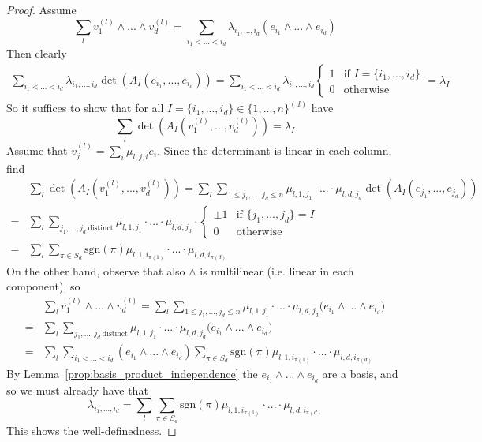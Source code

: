 \documentclass{scrartcl}
\newcommand{\sgn}{\mathrm{sgn}}
\theoremstyle{definition}
\begin{document}
\begin{proof}
    Assume
    \begin{equation*}
        \sum_l v_1^{(l)} \wedge ... \wedge v_d^{(l)} = \sum_{i_1 < ... < i_d} \lambda_{i_1, ..., i_d} (e_{i_1} \wedge ... \wedge e_{i_d})
    \end{equation*}
    Then clearly
    \begin{align*}
        \sum_{i_1 < ... < i_d} \lambda_{i_1, ..., i_d} \det(A_I(e_{i_1}, ..., e_{i_d})) = \sum_{i_1 < ... < i_d} \lambda_{i_1, ..., i_d} \begin{cases}
            1 & \text{if $I = \{i_1, ..., i_d\}$} \\
            0 & \text{otherwise}
        \end{cases} = \lambda_I
    \end{align*}
    So it suffices to show that for all $I = \{i_1, ..., i_d\} \in \{1, ..., n\}^{(d)}$ have
    \begin{equation*}
        \sum_l \det(A_I(v_1^{(l)}, ..., v_d^{(l)})) = \lambda_I
    \end{equation*}
    Assume that $v_j^{(l)} = \sum_i \mu_{l, j, i} e_i$. Since the determinant is linear in each column, find
    \begin{align*}
        &\sum_l \det(A_I(v_1^{(l)}, ..., v_d^{(l)})) = \sum_l \sum_{1 \leq j_1, ..., j_d \leq n} \mu_{l, 1, j_1} \cdot ... \cdot \mu_{l, d, j_d} \det(A_I(e_{j_1}, ..., e_{j_d})) \\
        =& \sum_l \sum_{j_1, ..., j_d \ \text{distinct}} \mu_{l, 1, j_1} \cdot ... \cdot \mu_{l, d, j_d} \cdot \begin{cases}
            \pm 1 & \text{if $\{j_1, ..., j_d\} = I$} \\
            0 & \text{otherwise}
        \end{cases} \\
        =& \sum_l \sum_{\pi \in S_d} \sgn(\pi) \mu_{l, 1, i_{\pi(1)}} \cdot ... \cdot \mu_{l, d, i_{\pi(d)}}
    \end{align*}
    On the other hand, observe that also $\wedge$ is multilinear (i.e. linear in each component), so
    \begin{align*}
        &\sum_l v_1^{(l)} \wedge ... \wedge v_d^{(l)} = \sum_l \sum_{1 \leq j_1, ..., j_d \leq n} \mu_{l, 1, j_1} \cdot ... \cdot \mu_{l, d, j_d} \bigl( e_{i_1} \wedge ... \wedge e_{i_d} \bigr) \\
        =& \sum_l \sum_{j_1, ..., j_d \ \text{distinct}} \mu_{l, 1, j_1} \cdot ... \cdot \mu_{l, d, j_d} \bigl( e_{i_1} \wedge ... \wedge e_{i_d} \bigr) \\
        =& \sum_l \sum_{i_1 < ... < i_d} (e_{i_1} \wedge ... \wedge e_{i_d}) \sum_{\pi \in S_d} \sgn(\pi) \mu_{l, 1, i_{\pi(1)}} \cdot ... \cdot \mu_{l, d, i_{\pi(d)}}
    \end{align*}
    By Lemma~\ref{prop:basis_product_independence} the $e_{i_1} \wedge ... \wedge e_{i_d}$ are a basis, and so we must already have that
    \begin{equation*}
        \lambda_{i_1, ..., i_d} = \sum_l \sum_{\pi \in S_d} \sgn(\pi) \mu_{l, 1, i_{\pi(1)}} \cdot ... \cdot \mu_{l, d, i_{\pi(d)}}
    \end{equation*}
    This shows the well-definedness.


\end{proof}
\end{document}
